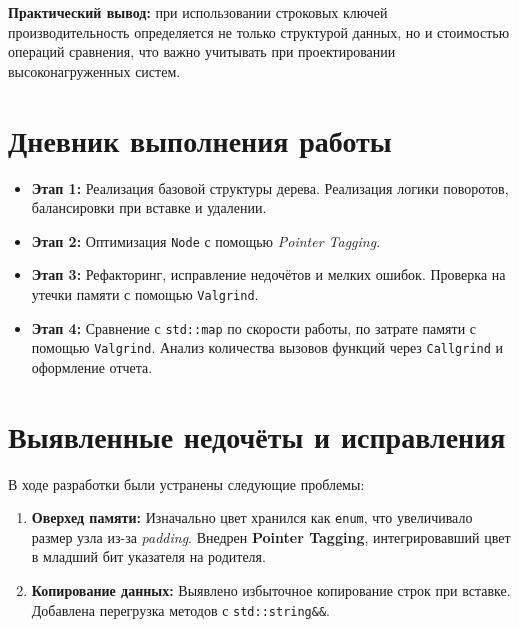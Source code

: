 \textbf{Практический вывод:} при использовании строковых ключей производительность определяется не только структурой данных, но и стоимостью операций сравнения, что важно учитывать при проектировании высоконагруженных систем.

\section{Дневник выполнения работы}

\begin{itemize}
    \item \textbf{Этап 1:} Реализация базовой структуры дерева. Реализация логики поворотов, балансировки при вставке и удалении.
    \item \textbf{Этап 2:} Оптимизация \texttt{Node} с помощью \textit{Pointer Tagging}.
    \item \textbf{Этап 3:} Рефакторинг, исправление недочётов и мелких ошибок. Проверка на утечки памяти с помощью \texttt{Valgrind}.
    \item \textbf{Этап 4:} Сравнение с \texttt{std::map} по скорости работы, по затрате памяти с помощью \texttt{Valgrind}. Анализ количества вызовов функций через \texttt{Callgrind} и оформление отчета.
\end{itemize}

\section{Выявленные недочёты и исправления}

В ходе разработки были устранены следующие проблемы:
\begin{enumerate}
    \item \textbf{Оверхед памяти:} Изначально цвет хранился как \texttt{enum}, что увеличивало размер узла из-за \textit{padding}. Внедрен \textbf{Pointer Tagging}, интегрировавший цвет в младший бит указателя на родителя.
    \item \textbf{Копирование данных:} Выявлено избыточное копирование строк при вставке. Добавлена перегрузка методов с \texttt{std::string\&\&}.
\end{enumerate}
